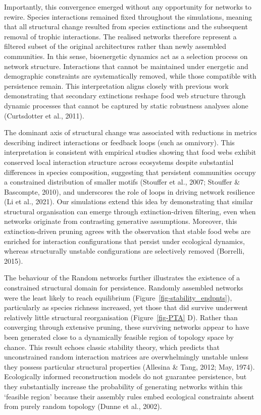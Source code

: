 \documentclass[
]{article}
\begin{document}
Importantly, this convergence emerged without any opportunity for
networks to rewire. Species interactions remained fixed throughout the
simulations, meaning that all structural change resulted from species
extinctions and the subsequent removal of trophic interactions. The
realised networks therefore represent a filtered subset of the original
architectures rather than newly assembled communities. In this sense,
bioenergetic dynamics act as a selection process on network structure.
Interactions that cannot be maintained under energetic and demographic
constraints are systematically removed, while those compatible with
persistence remain. This interpretation aligns closely with previous
work demonstrating that secondary extinctions reshape food web structure
through dynamic processes that cannot be captured by static robustness
analyses alone (Curtsdotter et al., 2011).

The dominant axis of structural change was associated with reductions in
metrics describing indirect interactions or feedback loops (such as
omnivory). This interpretation is consistent with empirical studies
showing that food webs exhibit conserved local interaction structure
across ecosystems despite substantial differences in species
composition, suggesting that persistent communities occupy a constrained
distribution of smaller motifs (Stouffer et al., 2007; Stouffer \&
Bascompte, 2010), and underscores the role of loops in driving network
resilience (Li et al., 2021). Our simulations extend this idea by
demonstrating that similar structural organisation can emerge through
extinction-driven filtering, even when networks originate from
contrasting generative assumptions. Moreover, this extinction-driven
pruning agrees with the observation that stable food webs are enriched
for interaction configurations that persist under ecological dynamics,
whereas structurally unstable configurations are selectively removed
(Borrelli, 2015).

The behaviour of the Random networks further illustrates the existence
of a constrained structural domain for persistence. Randomly assembled
networks were the least likely to reach equilibrium
(Figure~\ref{fig-stability_endpnts}), particularly as species richness
increased, yet those that did survive underwent relatively little
structural reorganisation (Figure~\ref{fig-PTA} D). Rather than
converging through extensive pruning, these surviving networks appear to
have been generated close to a dynamically feasible region of topology
space by chance. This result echoes classic stability theory, which
predicts that unconstrained random interaction matrices are
overwhelmingly unstable unless they possess particular structural
properties (Allesina \& Tang, 2012; May, 1974). Ecologically informed
reconstruction models do not guarantee persistence, but they
substantially increase the probability of generating networks within
this `feasible region' because their assembly rules embed ecological
constraints absent from purely random topology (Dunne et al., 2002).
\end{document}
